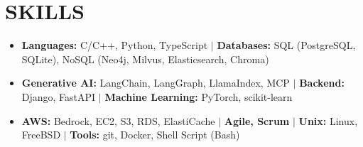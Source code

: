 \documentclass[letterpaper,11pt]{article}
\newcommand{\resumeItem}[1]{
  \item\small{#1}
}
\newcommand{\resumeItemListStart}{\begin{itemize}[label=$\vcenter{\hbox{\tiny$\bullet$}}$]}
\newcommand{\resumeItemListEnd}{\end{itemize}}
\begin{document}
\section{SKILLS}
\resumeItemListStart
\resumeItem{\textbf{Languages:} C/C++, Python, TypeScript $|$ \textbf{Databases:} SQL (PostgreSQL, SQLite), NoSQL (Neo4j, Milvus, Elasticsearch, Chroma)}
\resumeItem{\textbf{Generative AI:} LangChain, LangGraph, LlamaIndex, MCP $|$ \textbf{Backend:} Django, FastAPI $|$ \textbf{Machine Learning:} PyTorch, scikit-learn}
\resumeItem{\textbf{AWS:} Bedrock, EC2, S3, RDS, ElastiCache $|$ \textbf{Agile, Scrum} $|$ \textbf{Unix:} Linux, FreeBSD $|$ \textbf{Tools:} git, Docker, Shell Script (Bash)}
\resumeItemListEnd
\vspace{-40pt}
\end{document}
